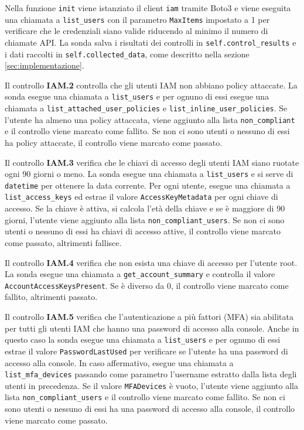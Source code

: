 Nella funzione \texttt{init} viene istanziato il client \texttt{iam} tramite Boto3 e viene eseguita una chiamata a \texttt{list\_users} con il parametro \texttt{MaxItems} impostato a 1 per verificare che le credenziali siano valide riducendo al minimo il numero di chiamate API. La sonda salva i risultati dei controlli in \texttt{self.control\_results} e i dati raccolti in \texttt{self.collected\_data}, come descritto nella sezione \ref{sec:implementazione}.

Il controllo \textbf{IAM.2} controlla che gli utenti IAM non abbiano policy attaccate. La sonda esegue una chiamata a \texttt{list\_users} e per ognuno di essi esegue una chiamata a \texttt{list\_attached\_user\_policies} e \texttt{list\_inline\_user\_policies}. Se l'utente ha almeno una policy attaccata, viene aggiunto alla lista \texttt{non\_compliant} e il controllo viene marcato come fallito. Se non ci sono utenti o nessuno di essi ha policy attaccate, il controllo viene marcato come passato.

Il controllo \textbf{IAM.3} verifica che le chiavi di accesso degli utenti IAM siano ruotate ogni 90 giorni o meno. La sonda esegue una chiamata a \texttt{list\_users} e si serve di \texttt{datetime} per ottenere la data corrente. Per ogni utente, esegue una chiamata a \texttt{list\_access\_keys} ed estrae il valore \texttt{AccessKeyMetadata} per ogni chiave di accesso. Se la chiave è attiva, si calcola l'età della chiave e se è maggiore di 90 giorni, l'utente viene aggiunto alla lista \texttt{non\_compliant\_users}. Se non ci sono utenti o nessuno di essi ha chiavi di accesso attive, il controllo viene marcato come passato, altrimenti fallisce.

Il controllo \textbf{IAM.4} verifica che non esista una chiave di accesso per l'utente root. La sonda esegue una chiamata a \texttt{get\_account\_summary} e controlla il valore \texttt{AccountAccessKeysPresent}. Se è diverso da 0, il controllo viene marcato come fallito, altrimenti passato.

Il controllo \textbf{IAM.5} verifica che l'autenticazione a più fattori (MFA) sia abilitata per tutti gli utenti IAM che hanno una password di accesso alla console. Anche in questo caso la sonda esegue una chiamata a \texttt{list\_users} e per ognuno di essi estrae il valore \texttt{PasswordLastUsed} per verificare se l'utente ha una password di accesso alla console. In caso affermativo, esegue una chiamata a \texttt{list\_mfa\_devices} passando come parametro l'username estratto dalla lista degli utenti in precedenza. Se il valore \texttt{MFADevices} è vuoto, l'utente viene aggiunto alla lista \texttt{non\_compliant\_users} e il controllo viene marcato come fallito. Se non ci sono utenti o nessuno di essi ha una password di accesso alla console, il controllo viene marcato come passato.

